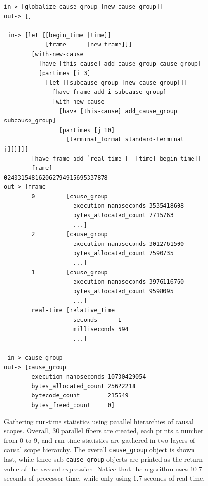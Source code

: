 \begin{figure}[h]
\centering
{\scriptsize
\begin{Verbatim}[frame=single]
 in-> [globalize cause_group [new cause_group]]
out-> []

 in-> [let [[begin_time [time]]
            [frame      [new frame]]]
        [with-new-cause
          [have [this-cause] add_cause_group cause_group]
          [partimes [i 3]
            [let [[subcause_group [new cause_group]]]
              [have frame add i subcause_group]
              [with-new-cause
                [have [this-cause] add_cause_group subcause_group]
                [partimes [j 10]
                  [terminal_format standard-terminal j]]]]]]
        [have frame add `real-time [- [time] begin_time]]
        frame]
024031548162062794915695337878                      
out-> [frame
        0         [cause_group
                    execution_nanoseconds 3535418608
                    bytes_allocated_count 7715763
                    ...]
        2         [cause_group
                    execution_nanoseconds 3012761500
                    bytes_allocated_count 7590735
                    ...]
        1         [cause_group
                    execution_nanoseconds 3976116760
                    bytes_allocated_count 9598095
                    ...]
        real-time [relative_time
                    seconds      1
                    milliseconds 694
                    ...]]

 in-> cause_group
out-> [cause_group
        execution_nanoseconds 10730429054
        bytes_allocated_count 25622218
        bytecode_count        215649
        bytes_freed_count     0]
\end{Verbatim}
}
\caption[Gathering run-time statistics using parallel hierarchies of
  causal scopes.]{Gathering run-time statistics using parallel
  hierarchies of causal scopes.  Overall, $30$ parallel fibers are
  created, each prints a number from $0$ to $9$, and run-time
  statistics are gathered in two layers of causal scope hierarchy.
  The overall {\tt{cause\_group}} object is shown last, while three
  sub-{\tt{cause\_group}} objects are printed as the return value of
  the second expression.  Notice that the algorithm uses $10.7$
  seconds of processor time, while only using $1.7$ seconds of
  real-time.}
\label{figure:hierarchical_cause_group_statistics}
\end{figure}

